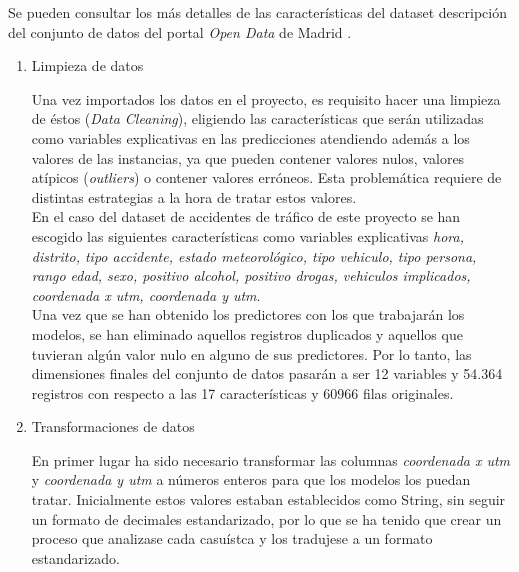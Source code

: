 \begin{enumerate}
\begin{table}[H]
            \end{table}


            Se pueden consultar los más detalles de las características del dataset descripción del conjunto de datos del portal \textit{Open Data} de Madrid \cite{InfoDatasetMadrid}.\\


            \begin{enumerate}

                \item Limpieza de datos

                    Una vez importados los datos en el proyecto, es requisito hacer una limpieza de éstos (\textit{Data Cleaning}), eligiendo las características que serán utilizadas como variables explicativas en las predicciones atendiendo además a los valores de las instancias, ya que pueden contener valores nulos, valores atípicos (\textit{outliers}) o contener valores erróneos. Esta problemática requiere de distintas estrategias a la hora de tratar estos valores.\\

                    En el caso del dataset de accidentes de tráfico de este proyecto se han escogido las siguientes características como variables explicativas \textit{hora, distrito, tipo accidente, estado meteorológico, tipo vehiculo, tipo persona, rango edad, sexo, positivo alcohol, positivo drogas, vehiculos implicados, coordenada x utm, coordenada y utm}.\\


                    Una vez que se han obtenido los predictores con los que trabajarán los modelos, se han eliminado aquellos registros duplicados y aquellos que tuvieran algún valor nulo en alguno de sus predictores. Por lo tanto, las dimensiones finales del conjunto de datos pasarán a ser 12 variables y 54.364 registros con respecto a las 17 características y 60966 filas originales.\\



                \item Transformaciones de datos


                    En primer lugar ha sido necesario transformar las columnas \textit{coordenada x utm} y \textit{coordenada y utm} a números enteros para que los modelos los puedan tratar. Inicialmente estos valores estaban establecidos como String, sin seguir un formato de decimales estandarizado, por lo que se ha tenido que crear un proceso que analizase cada casuístca y los tradujese a un formato estandarizado.



\end{enumerate}
\end{enumerate}

